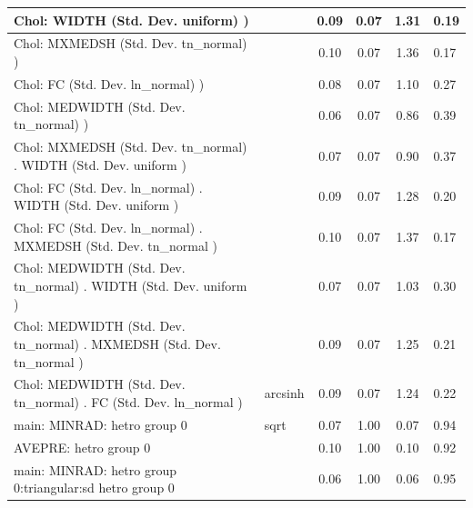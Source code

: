 \begin{table}
\begin{center}
\begin{tabular}{|l|l|c|c|c|l|}
			 Chol: WIDTH (Std. Dev. uniform) ) &  & 0.09 & 0.07 & 1.31 & 0.19 \\
			\hline
			 Chol: MXMEDSH (Std. Dev. tn_normal) ) &  & 0.10 & 0.07 & 1.36 & 0.17 \\
			\hline
			 Chol: FC (Std. Dev. ln_normal) ) &  & 0.08 & 0.07 & 1.10 & 0.27 \\
			\hline
			 Chol: MEDWIDTH (Std. Dev. tn_normal) ) &  & 0.06 & 0.07 & 0.86 & 0.39 \\
			\hline
			 Chol: MXMEDSH (Std. Dev. tn_normal) . WIDTH (Std. Dev.   uniform ) &  & 0.07 & 0.07 & 0.90 & 0.37 \\
			\hline
			 Chol: FC (Std. Dev. ln_normal) . WIDTH (Std. Dev.   uniform ) &  & 0.09 & 0.07 & 1.28 & 0.20 \\
			\hline
			 Chol: FC (Std. Dev. ln_normal) . MXMEDSH (Std. Dev.   tn_normal ) &  & 0.10 & 0.07 & 1.37 & 0.17 \\
			\hline
			 Chol: MEDWIDTH (Std. Dev. tn_normal) . WIDTH (Std. Dev.   uniform ) &  & 0.07 & 0.07 & 1.03 & 0.30 \\
			\hline
			 Chol: MEDWIDTH (Std. Dev. tn_normal) . MXMEDSH (Std. Dev.   tn_normal ) &  & 0.09 & 0.07 & 1.25 & 0.21 \\
			\hline
			 Chol: MEDWIDTH (Std. Dev. tn_normal) . FC (Std. Dev.   ln_normal ) & arcsinh & 0.09 & 0.07 & 1.24 & 0.22 \\
			\hline
			main: MINRAD: hetro group 0 & sqrt & 0.07 & 1.00 & 0.07 & 0.94 \\
			\hline
			AVEPRE: hetro group 0 &  & 0.10 & 1.00 & 0.10 & 0.92 \\
			\hline
			main: MINRAD: hetro group 0:triangular:sd  hetro group 0 &  & 0.06 & 1.00 & 0.06 & 0.95 \\
			\hline
		\end{tabular}
	\end{center}
\end{table}